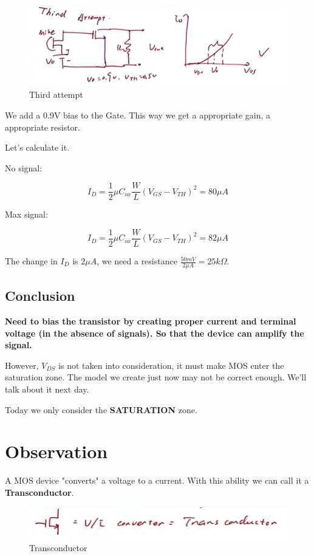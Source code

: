 \documentclass[fontset=windows]{article}
\begin{document}
\begin{figure}[htbp]
    \centering
    \includegraphics[scale=0.6]{6.jpg}
    \captionsetup{labelformat=empty}
    \caption{Third attempt}
    \label{6}
\end{figure}

We add a 0.9V bias to the Gate. This way we get a appropriate gain, a appropriate resistor. 

Let's calculate it. 

No signal: 

$$I_D=\frac{1}{2} \mu C_{ox}\frac{W}{L}(V_{GS}-V_{TH})^2=80\mu A$$

Max signal: 

$$I_D=\frac{1}{2} \mu C_{ox}\frac{W}{L}(V_{GS}-V_{TH})^2=82\mu A$$

The change in $I_D$ is $2\mu A$, we need a resistance $\frac{50mV}{2\mu A}=25k\Omega$. 

\subsection*{Conclusion}
\textbf{Need to bias the transistor by creating proper current and terminal voltage (in the absence of signals). 
So that the device can amplify the signal.}

However, $V_{DS}$ is not taken into consideration, it must make MOS enter the saturation zone. The model we create just now may not be correct enough. 
We'll talk about it next day. 

Today we only consider the \textbf{SATURATION} zone. 

\section*{Observation}

A MOS device "converts" a voltage to a current. With this ability we can call it a \textbf{Transconductor}. 

\begin{figure}[htbp]
    \centering
    \includegraphics[scale=0.6]{7.jpg}
    \captionsetup{labelformat=empty}
    \caption{Transconductor}
    \label{7}
\end{figure}
\end{document}
